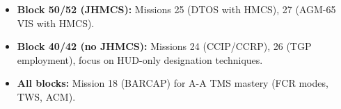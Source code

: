 \documentclass[11pt, a4paper, twoside]{report}
\begin{document}
\begin{itemize}
    \item \textbf{Block 50/52 (JHMCS):} Missions 25 (DTOS with HMCS), 27 (AGM-65 VIS with HMCS).
    \item \textbf{Block 40/42 (no JHMCS):} Missions 24 (CCIP/CCRP), 26 (TGP employment), focus on HUD-only designation techniques.
    \item \textbf{All blocks:} Mission 18 (BARCAP) for A-A TMS mastery (FCR modes, TWS, ACM).
\end{itemize}

\end{document}

